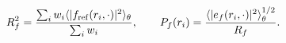 \begin{equation}
R_f^2=\frac{\sum_i w_i\langle|f_{\rm ref}(r_i,\cdot)|^2\rangle_\theta}{\sum_i w_i},
 \qquad P_f(r_i)=\frac{\langle|e_f(r_i,\cdot)|^2\rangle_\theta^{1/2}}{R_f}.
\label{eq:review-profile-norm}
\end{equation}
